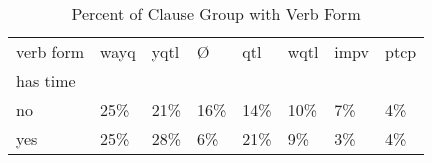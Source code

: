 \begin{table}[htbp!]
\centering
\caption{Percent of Clause Group with Verb Form}
\label{table:main_verb_pr}
\begin{tabular}{llllllll}
\toprule
verb form & wayq & yqtl &    Ø &  qtl & wqtl & impv & ptcp \\
has time &      &      &      &      &      &      &      \\
\midrule
no       &  25\% &  21\% &  16\% &  14\% &  10\% &   7\% &   4\% \\
yes      &  25\% &  28\% &   6\% &  21\% &   9\% &   3\% &   4\% \\
\bottomrule
\end{tabular}
\end{table}
